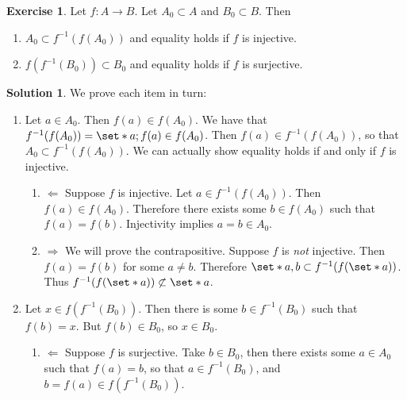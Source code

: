 \documentclass[11pt]{article}
\numberwithin{equation}{section}
\newcounter{theo}[section]\setcounter{theo}{0}
\theoremstyle{definition}
\theoremstyle{definition}
\newtheorem*{solution}{\color{Goldenrod}Solution}
\newtheorem{exercise}{\color{YellowOrange}Exercise}[section]
\newcommand\inv[1]{#1^{-1}}
\def\Set{\set*}%
\def\imp{\Rightarrow}
\def\pmi{\Leftarrow}
\newcommand{\1}{\mathbbm 1}
\begin{document}
\begin{exercise}
 Let $f : A \to B$. Let $A_0 \subset A$ and $B_0 \subset B$. Then
 \begin{enumerate}
  	\item $A_0 \subset \inv{f}(f(A_0))$ and equality holds if $f$ is injective.
  	\item $f(\inv{f}(B_0)) \subset B_0$ and equality holds if $f$ is surjective.
  \end{enumerate} 
\end{exercise}
\begin{solution} We prove each item in turn:
\begin{enumerate}
	\item Let $a \in A_0$. Then $f(a) \in f(A_0)$. We have that $\inv{f}(f(A_0)) = \Set{a;f(a) \in f(A_0)}$. Then $f(a) \in \inv{f}(f(A_0))$, so that $A_0 \subset \inv{f}(f(A_0))$. We can actually show equality holds if and only if $f$ is injective. 
	\begin{enumerate}
		\item $\pmi$ Suppose $f$ is injective. Let $a \in \inv{f}(f(A_0))$. Then $f(a) \in f(A_0)$. Therefore there exists some $b \in f(A_0)$ such that $f(a) = f(b)$. Injectivity implies $a=b \in A_0$. 
		\item $\imp$ We will prove the contrapositive. Suppose $f$ is \emph{not} injective. Then $f(a) = f(b)$ for some $a \neq b$. Therefore $\Set{a,b} \subset \inv{f}(f(\Set{a}))$. Thus $\inv{f}(f(\Set{a})) \not\subset \Set{a}$.
	\end{enumerate}
	\item Let $x \in f(\inv{f}(B_0))$. Then there is some $b \in \inv{f}(B_0)$ such that $f(b) = x$. But $f(b) \in B_0$, so $x \in B_0$.
	\begin{enumerate}
		\item $\pmi$ Suppose $f$ is surjective. Take $b \in B_0$, then there exists some $a \in A_0$ such that $f(a) = b$, so that $a \in \inv{f}(B_0)$, and $b=f(a) \in f(\inv{f}(B_0))$. 
	\end{enumerate}
\end{enumerate}
\end{solution}
\end{document}
